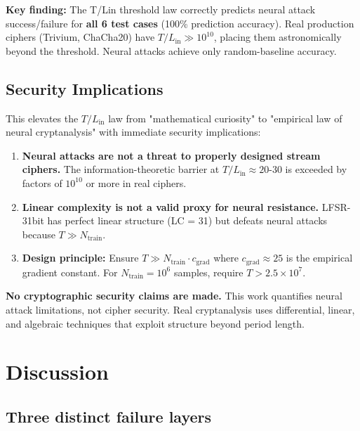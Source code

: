 \documentclass[11pt]{article}
\theoremstyle{plain}
\theoremstyle{definition}
\begin{document}
\textbf{Key finding:} The T/Lin threshold law correctly predicts neural attack success/failure for \textbf{all 6 test cases} (100\% prediction accuracy). Real production ciphers (Trivium, ChaCha20) have $T/L_{\mathrm{in}} \gg 10^{10}$, placing them astronomically beyond the threshold. Neural attacks achieve only random-baseline accuracy.

\subsection{Security Implications}

This elevates the $T/L_{\mathrm{in}}$ law from "mathematical curiosity" to "empirical law of neural cryptanalysis" with immediate security implications:

\begin{enumerate}
\item \textbf{Neural attacks are not a threat to properly designed stream ciphers.} The information-theoretic barrier at $T/L_{\mathrm{in}} \approx 20$-30 is exceeded by factors of $10^{10}$ or more in real ciphers.

\item \textbf{Linear complexity is not a valid proxy for neural resistance.} LFSR-31bit has perfect linear structure (LC = 31) but defeats neural attacks because $T \gg N_{\mathrm{train}}$.

\item \textbf{Design principle:} Ensure $T \gg N_{\mathrm{train}} \cdot c_{\mathrm{grad}}$ where $c_{\mathrm{grad}} \approx 25$ is the empirical gradient constant. For $N_{\mathrm{train}} = 10^6$ samples, require $T > 2.5 \times 10^7$.
\end{enumerate}

\textbf{No cryptographic security claims are made.} This work quantifies neural attack limitations, not cipher security. Real cryptanalysis uses differential, linear, and algebraic techniques that exploit structure beyond period length.

\section{Discussion}
\label{sec:discussion}

\subsection{Three distinct failure layers}
\end{document}
